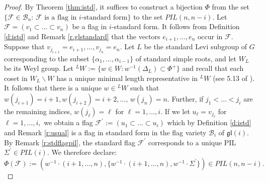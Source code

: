 \documentclass[12pt]{amsart}
\numberwithin{equation}{section}
\theoremstyle{remark}
\theoremstyle{definition}
\newcommand{\fgl}{\mathfrak{gl}}
\newcommand{\B}{\mathcal{B}}
\newcommand{\F}{\mathcal{F}}
\begin{document}
\begin{proof}
By Theorem \ref{thm:istd}, it suffices to construct a bijection
 $\Phi$ from the set $\{\F\in\B_{n}:\, \F \mbox{ is a flag in $i$-standard form}\}$ to the set $PIL(n,n-i)$.  
Let $\F=(v_{1}\subset\dots\subset v_{n})$ be a flag in $i$-standard form.  It follows from Definition \ref{d:istd} and Remark \ref{r.glstandard} that the vectors $e_{i+1},\dots, e_{n}$ occur in $\F$.  Suppose that $v_{j_{i+1}}=e_{i+1},\dots, v_{j_{n}}=e_{n}$.  Let $L$ be the standard Levi subgroup of $G$ corresponding to the  subset $\{\alpha_{1},\dots,\alpha_{i-1}\}$ of standard simple roots, and let $W_{L}$ be its Weyl group.   Let ${}^LW := \{ w\in W : w^{-1}(\Delta_L) \subset \Phi^+ \}$ and recall that each coset in $W_{L}\backslash W$ has a unique minimal length representative in ${}^LW$ (see 5.13 of \cite{Kostant-BW}).
It follows that there is a unique $w\in {}^LW$ such that $w(j_{i+1}) = i+1, w(j_{i+2}) = i+2, \dots, \, w(j_{n})=n.$  Further, if $j_1 < \dots < j_i$ are the remaining indices, $w(j_{\ell})=\ell$ for $\ell = 1, \dots, i.$ 
If we let $u_{\ell}=v_{j_{\ell}}$ for $\ell=1, \dots, i,$ we obtain a flag
$\F^{\prime}:=(u_{1}\subset \dots \subset u_{i})$ which by Definition \ref{d:istd} and Remark \ref{r:usual} is a flag in standard form in the flag variety $\B_{i}$ of $\fgl(i)$. By Remark \ref{r:stdflagpil}, the standard flag $\F^{\prime}$ corresponds to a unique PIL $\Sigma^{\prime}\in PIL(i)$.  We therefore declare:
\begin{equation}\label{eq:Phidefn}
\Phi(\F):=(w^{-1}\cdot (i+1,\dots, n), \{w^{-1}\cdot (i+1,\dots, n), w^{-1}\cdot\Sigma^{\prime}\})\in PIL(n,n-i).
\end{equation}


\end{proof}
\end{document}
